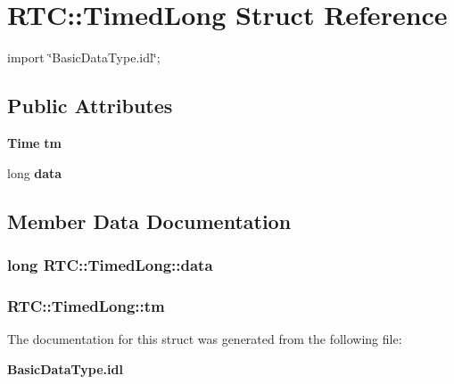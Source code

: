 \section{RTC::TimedLong Struct Reference}
\label{structRTC_1_1TimedLong}


{\ttfamily import \char`\"{}BasicDataType.idl\char`\"{};}

\subsection*{Public Attributes}
\begin{DoxyCompactItemize}
\item 
{\bf Time} {\bf tm}
\item 
long {\bf data}
\end{DoxyCompactItemize}


\subsection{Member Data Documentation}
\subsubsection[{data}]{\setlength{\rightskip}{0pt plus 5cm}long {\bf RTC::TimedLong::data}}\label{structRTC_1_1TimedLong_a776b78537c9dad5557a57a88a66b5942}
\subsubsection[{tm}]{ {\bf RTC::TimedLong::tm}}\label{structRTC_1_1TimedLong_a9bba771ba1996f1a2e85de1ce77041b9}


The documentation for this struct was generated from the following file:\begin{DoxyCompactItemize}
\item 
{\bf BasicDataType.idl}\end{DoxyCompactItemize}
